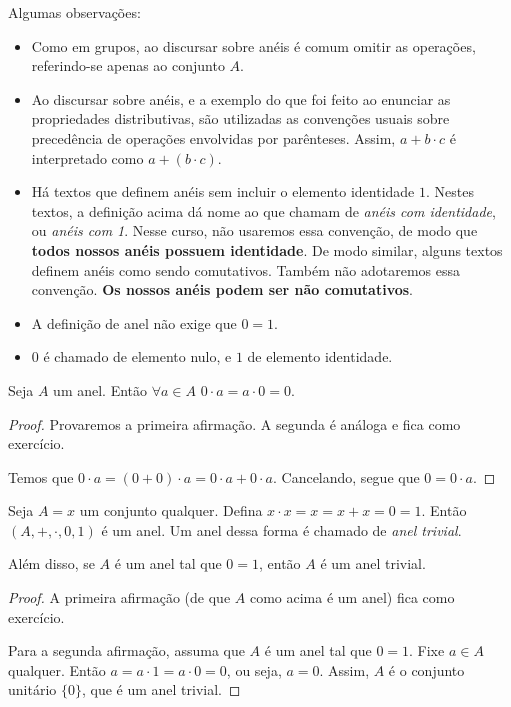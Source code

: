 Algumas observações:
\begin{itemize}
    \item Como em grupos, ao discursar sobre anéis é comum omitir as operações, referindo-se apenas ao conjunto $A$.
    \item Ao discursar sobre anéis, e a exemplo do que foi feito ao enunciar as propriedades distributivas, são utilizadas as convenções usuais sobre precedência de operações envolvidas por parênteses.
    Assim, $a + b \cdot c$ é interpretado como $a + (b \cdot c)$.
    \item Há textos que definem anéis sem incluir o elemento identidade $1$.
    Nestes textos, a definição acima dá nome ao que chamam de \emph{anéis com identidade}, ou \emph{anéis com 1}.
    Nesse curso, não usaremos essa convenção, de modo que \textbf{todos nossos anéis possuem identidade}.
    De modo similar, alguns textos definem anéis como sendo comutativos. Também não adotaremos essa convenção.
    \textbf{Os nossos anéis podem ser não comutativos}.
    \item A definição de anel não exige que $0=1$.
    \item $0$ é chamado de elemento nulo, e $1$ de elemento identidade.
\end{itemize}

\begin{prop}
    Seja $A$ um anel.
    Então $\forall a \in A$ $0 \cdot a = a \cdot 0 = 0$.
\end{prop}
\begin{proof}
Provaremos a primeira afirmação.
A segunda é análoga e fica como exercício.

Temos que $0\cdot a=(0+0)\cdot a=0\cdot a +0\cdot a$.
Cancelando, segue que $0=0\cdot a$.
\end{proof}

\begin{prop}
    Seja $A={x}$ um conjunto qualquer.
    Defina $x\cdot x=x=x+x=0=1$.
    Então $(A, +, \cdot, 0, 1)$ é um anel.
    Um anel dessa forma é chamado de \emph{anel trivial}.
    
    Além disso, se $A$ é um anel tal que $0=1$, então $A$ é um anel trivial.
\end{prop}
\begin{proof}
    A primeira afirmação (de que $A$ como acima é um anel) fica como exercício.

    Para a segunda afirmação, assuma que $A$ é um anel tal que $0=1$.
    Fixe $a \in A$ qualquer.
    Então $a=a\cdot1=a\cdot0=0$, ou seja, $a=0$.
    Assim, $A$ é o conjunto unitário $\{0\}$, que é um anel trivial.
\end{proof}

